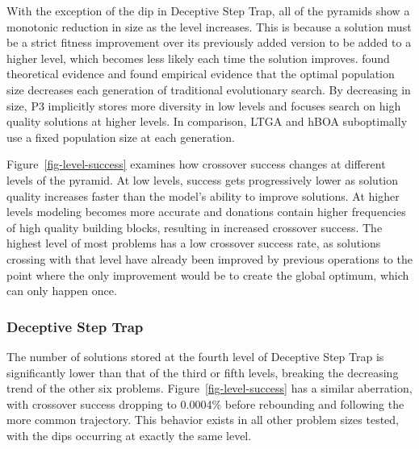 \documentclass[twoside]{article}
\begin{document}
With the exception of the dip in Deceptive Step Trap, all of the pyramids show a monotonic reduction
in size as the level increases. This is because a solution must be a strict fitness improvement
over its previously added version to be added to a higher level, which becomes less likely
each time the solution improves. \cite{lobo:2011:dynamicpop} found theoretical evidence
and \cite{goldman:2011:dynamic-parameters} found empirical evidence that the optimal
population size decreases each generation of traditional evolutionary search.
By decreasing in size, P3 implicitly stores more diversity in low levels and focuses
search on high quality solutions at higher levels. In comparison,
LTGA and hBOA suboptimally use a fixed population size at each generation.

Figure~\ref{fig-level-success} examines how crossover success changes at different
levels of the pyramid. At low levels, success gets progressively lower
as solution quality increases faster than the model's ability to improve solutions.
At higher levels modeling becomes more accurate and donations contain higher frequencies
of high quality building blocks, resulting in increased crossover success. The
highest level of most problems has a low crossover success rate, as solutions
crossing with that level have already been improved by previous operations to
the point where the only improvement would be to create the global optimum, which can
only happen once.

\subsubsection{Deceptive Step Trap}
The number of solutions stored at the fourth level of Deceptive Step Trap is
significantly lower than that of the third or fifth levels, breaking the decreasing
trend of the other six problems. Figure~\ref{fig-level-success} has a similar
aberration, with crossover success dropping to  0.0004\% before rebounding and
following the more common trajectory. This behavior exists in all other problem
sizes tested, with the dips occurring at exactly the same level.
\end{document}
